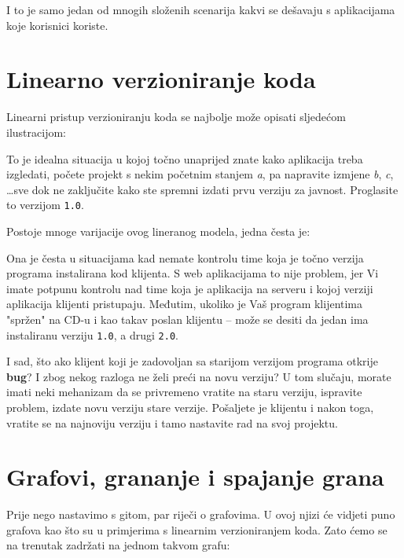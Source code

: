 I to je samo jedan od mnogih složenih scenarija kakvi se dešavaju s aplikacijama koje korisnici koriste.

\section*{Linearno verzioniranje koda}

Linearni pristup verzioniranju koda se najbolje može opisati sljedećom ilustracijom:



To je idealna situacija u kojoj točno unaprijed znate kako aplikacija treba izgledati, počete projekt s nekim početnim stanjem \emph{a}, pa napravite izmjene \emph{b}, \emph{c}, \dots sve dok ne zaključite kako ste spremni izdati prvu verziju za javnost.
Proglasite to verzijom \texttt{1.0}. 

Postoje mnoge varijacije ovog lineranog modela, jedna česta je:



Ona je česta u situacijama kad nemate kontrolu time koja je točno verzija programa instalirana kod klijenta. 
S web aplikacijama to nije problem, jer Vi imate potpunu kontrolu nad time koja je aplikacija na serveru i kojoj verziji aplikacija klijenti pristupaju.
Međutim, ukoliko je Vaš program klijentima "spržen" na CD-u i kao takav poslan klijentu -- može se desiti da jedan ima instaliranu verziju \texttt{1.0}, a drugi \texttt{2.0}.

I sad, što ako klijent koji je zadovoljan sa starijom verzijom programa otkrije \textbf{bug}?
I zbog nekog razloga ne želi preći na novu verziju?
U tom slučaju, morate imati neki mehanizam da se privremeno vratite na staru verziju, ispravite problem, izdate novu verziju stare verzije. 
Pošaljete je klijentu i nakon toga, vratite se na najnoviju verziju i tamo nastavite rad na svoj projektu.

\section*{Grafovi, grananje i spajanje grana}

Prije nego nastavimo s gitom, par riječi o grafovima. 
U ovoj njizi će vidjeti puno grafova kao što su u primjerima s linearnim verzioniranjem koda. 
Zato ćemo se na trenutak zadržati na jednom takvom grafu:

